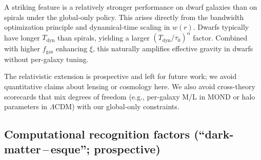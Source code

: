\documentclass[12pt,a4paper]{article}
\begin{document}
A striking feature is a relatively stronger performance on dwarf galaxies than on spirals under the global-only policy. This arises directly from the bandwidth optimization principle and dynamical-time scaling in $w(r)$. Dwarfs typically have longer $T_\mathrm{dyn}$ than spirals, yielding a larger $(T_\mathrm{dyn}/\tau_0)^\alpha$ factor. Combined with higher $f_\mathrm{gas}$ enhancing $\xi$, this naturally amplifies effective gravity in dwarfs without per-galaxy tuning.

The relativistic extension is prospective and left for future work; we avoid quantitative claims about lensing or cosmology here. We also avoid cross-theory scorecards that mix degrees of freedom (e.g., per-galaxy M/L in MOND or halo parameters in $\Lambda$CDM) with our global-only constraints.

\subsection{Computational recognition factors (``dark-matter\,--\,esque''; prospective)}
\label{subsec:computational-factors}
\end{document}
